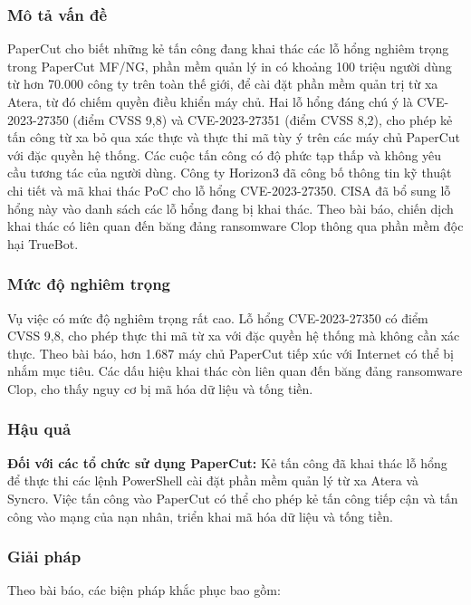 \subsubsection{Mô tả vấn đề}
PaperCut cho biết những kẻ tấn công đang khai thác các lỗ hổng nghiêm trọng trong PaperCut MF/NG, phần mềm quản lý in có khoảng 100 triệu người dùng từ hơn 70.000 công ty trên toàn thế giới, để cài đặt phần mềm quản trị từ xa Atera, từ đó chiếm quyền điều khiển máy chủ. Hai lỗ hổng đáng chú ý là CVE-2023-27350 (điểm CVSS 9,8) và CVE-2023-27351 (điểm CVSS 8,2), cho phép kẻ tấn công từ xa bỏ qua xác thực và thực thi mã tùy ý trên các máy chủ PaperCut với đặc quyền hệ thống. Các cuộc tấn công có độ phức tạp thấp và không yêu cầu tương tác của người dùng. Công ty Horizon3 đã công bố thông tin kỹ thuật chi tiết và mã khai thác PoC cho lỗ hổng CVE-2023-27350. CISA đã bổ sung lỗ hổng này vào danh sách các lỗ hổng đang bị khai thác. Theo bài báo, chiến dịch khai thác có liên quan đến băng đảng ransomware Clop thông qua phần mềm độc hại TrueBot.

\subsubsection{Mức độ nghiêm trọng}
Vụ việc có mức độ nghiêm trọng rất cao. Lỗ hổng CVE-2023-27350 có điểm CVSS 9,8, cho phép thực thi mã từ xa với đặc quyền hệ thống mà không cần xác thực. Theo bài báo, hơn 1.687 máy chủ PaperCut tiếp xúc với Internet có thể bị nhắm mục tiêu. Các dấu hiệu khai thác còn liên quan đến băng đảng ransomware Clop, cho thấy nguy cơ bị mã hóa dữ liệu và tống tiền.

\subsubsection{Hậu quả}
\textbf{Đối với các tổ chức sử dụng PaperCut:} Kẻ tấn công đã khai thác lỗ hổng để thực thi các lệnh PowerShell cài đặt phần mềm quản lý từ xa Atera và Syncro. Việc tấn công vào PaperCut có thể cho phép kẻ tấn công tiếp cận và tấn công vào mạng của nạn nhân, triển khai mã hóa dữ liệu và tống tiền.

\subsubsection{Giải pháp}
Theo bài báo, các biện pháp khắc phục bao gồm:

